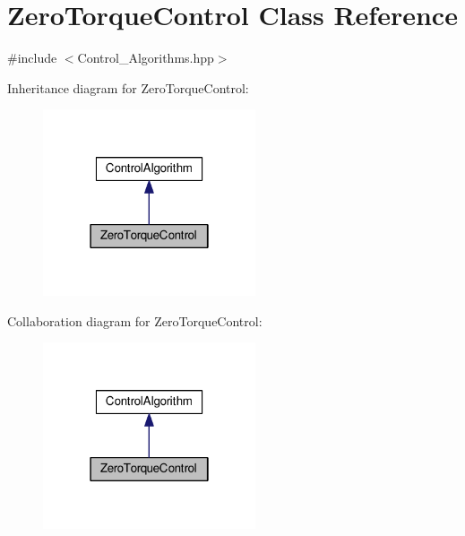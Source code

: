 \hypertarget{classZeroTorqueControl}{}\section{Zero\+Torque\+Control Class Reference}
\label{classZeroTorqueControl}


{\ttfamily \#include $<$Control\+\_\+\+Algorithms.\+hpp$>$}



Inheritance diagram for Zero\+Torque\+Control\+:\nopagebreak
\begin{figure}[H]
\begin{center}
\leavevmode
\includegraphics[width=178pt]{classZeroTorqueControl__inherit__graph}
\end{center}
\end{figure}


Collaboration diagram for Zero\+Torque\+Control\+:
\nopagebreak
\begin{figure}[H]
\begin{center}
\leavevmode
\includegraphics[width=178pt]{classZeroTorqueControl__coll__graph}
\end{center}
\end{figure}
